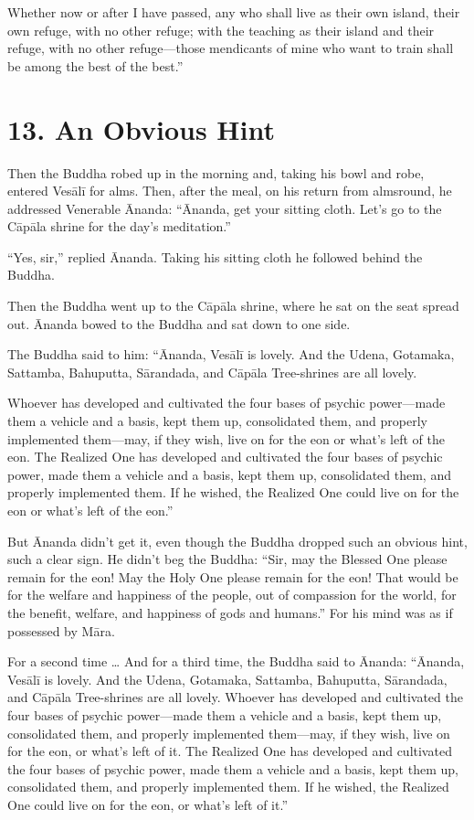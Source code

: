 \documentclass[12pt,openany]{book}%
\begin{document}
Whether now or after I have passed, any who shall live as their own island, their own refuge, with no other refuge; with the teaching as their island and their refuge, with no other refuge—those mendicants of mine who want to train shall be among the best of the best.” 

\section*{13. An Obvious Hint }

Then the Buddha robed up in the morning and, taking his bowl and robe, entered \textsanskrit{Vesālī} for alms. Then, after the meal, on his return from almsround, he addressed Venerable Ānanda: “Ānanda, get your sitting cloth. Let’s go to the \textsanskrit{Cāpāla} shrine for the day’s meditation.” 

“Yes, sir,” replied Ānanda. Taking his sitting cloth he followed behind the Buddha. 

Then the Buddha went up to the \textsanskrit{Cāpāla} shrine, where he sat on the seat spread out. Ānanda bowed to the Buddha and sat down to one side. 

The Buddha said to him: “Ānanda, \textsanskrit{Vesālī} is lovely. And the Udena, Gotamaka, Sattamba, Bahuputta, \textsanskrit{Sārandada}, and \textsanskrit{Cāpāla} Tree-shrines are all lovely. 

Whoever has developed and cultivated the four bases of psychic power—made them a vehicle and a basis, kept them up, consolidated them, and properly implemented them—may, if they wish, live on for the eon or what’s left of the eon. The Realized One has developed and cultivated the four bases of psychic power, made them a vehicle and a basis, kept them up, consolidated them, and properly implemented them. If he wished, the Realized One could live on for the eon or what’s left of the eon.” 

But Ānanda didn’t get it, even though the Buddha dropped such an obvious hint, such a clear sign. He didn’t beg the Buddha: “Sir, may the Blessed One please remain for the eon! May the Holy One please remain for the eon! That would be for the welfare and happiness of the people, out of compassion for the world, for the benefit, welfare, and happiness of gods and humans.” For his mind was as if possessed by \textsanskrit{Māra}. 

For a second time … And for a third time, the Buddha said to Ānanda: “Ānanda, \textsanskrit{Vesālī} is lovely. And the Udena, Gotamaka, Sattamba, Bahuputta, \textsanskrit{Sārandada}, and \textsanskrit{Cāpāla} Tree-shrines are all lovely. Whoever has developed and cultivated the four bases of psychic power—made them a vehicle and a basis, kept them up, consolidated them, and properly implemented them—may, if they wish, live on for the eon, or what’s left of it. The Realized One has developed and cultivated the four bases of psychic power, made them a vehicle and a basis, kept them up, consolidated them, and properly implemented them. If he wished, the Realized One could live on for the eon, or what’s left of it.” 
\end{document}
